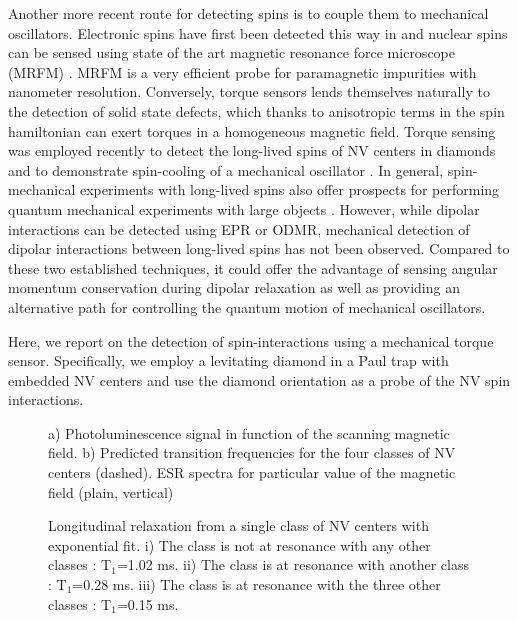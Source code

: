 \documentclass[preprintnumbers,amsmath,amssymb,superscriptaddress,twocolumn,showpacs]{revtex4-1}
\begin{document}
Another more recent route for detecting spins is to couple them to mechanical oscillators.
Electronic spins have first been detected this way in \cite{Alzetta} and nuclear spins can be sensed using state of the art magnetic resonance force microscope (MRFM) \cite{rugar, MaminH}. MRFM is a very efficient probe for paramagnetic impurities with nanometer resolution.
Conversely, torque sensors lends themselves naturally to the detection of solid state defects, which thanks to anisotropic terms in the spin hamiltonian can exert torques in a homogeneous magnetic field. 
Torque sensing was employed recently to detect the long-lived spins of NV centers in diamonds and to demonstrate spin-cooling of a mechanical oscillator \cite{DelordNat}.
In general, spin-mechanical experiments with long-lived spins also offer prospects for performing quantum mechanical experiments with large objects \cite{yin, Wan, Scala, Lee_2017}. However, while dipolar interactions can be detected using EPR or ODMR, mechanical detection of dipolar interactions between long-lived spins has not been observed. Compared to these two established techniques, it could offer the advantage of sensing angular momentum conservation during dipolar relaxation \cite{Zangara} as well as providing an alternative path for controlling the quantum motion of mechanical oscillators.

Here, we report on the detection of spin-interactions using a mechanical torque sensor.
Specifically, we employ a levitating diamond in a Paul trap with embedded NV centers and use the diamond orientation as a probe of the NV spin interactions.


\begin{figure}[!ht]
  \centering {}
  \caption{a) Photoluminescence signal in function of the scanning magnetic field. b) Predicted transition frequencies for the four classes of NV centers (dashed). ESR spectra for particular value of the magnetic field (plain, vertical)}
  \label{CR_deposited}
\end{figure}


\begin{figure}[!ht]
  \centering {}
  \caption{Longitudinal relaxation from a single class of NV centers with exponential fit. i) The class is not at resonance with any other classes : T$_1$=1.02 ms. ii) The class is at resonance with another class : T$_1$=0.28 ms. iii) The class is at resonance with the three other classes : T$_1$=0.15 ms.
  }\label{T_1}
\end{figure}
\end{document}
